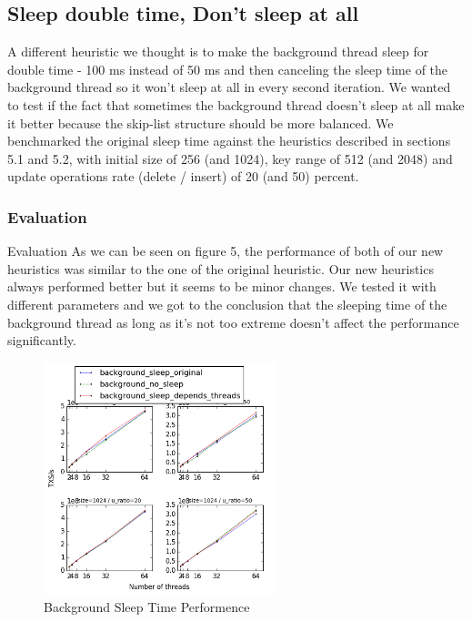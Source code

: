 \documentclass{article}
\begin{document}
\subsection{Sleep double time, Don't sleep at all}
\label{ssec:sdt}

A different heuristic we thought is to make the background thread sleep for double time - 100 ms instead of 50 ms and then canceling the sleep time of the background thread so it won't sleep at all in every second iteration.
We wanted to test if the fact that sometimes the background thread doesn't sleep at all make it better because the skip-list structure should be more balanced.
We benchmarked the original sleep time against the heuristics described in sections 5.1 and 5.2, with initial size of 256 (and 1024), key range of 512 (and 2048) and update operations rate (delete / insert) of 20 (and 50) percent. 

\subsubsection{Evaluation}
\label{sssec:dsrs-evl1}

Evaluation As we can be seen on figure 5, the performance of both of our new heuristics was similar to the one of the original heuristic. Our new heuristics always performed better but it seems to be minor changes. We tested it with different parameters and we got to the conclusion that the sleeping time of the background thread as long as it's not too extreme doesn't affect the performance significantly.

\begin{figure}
	\caption{Background Sleep Time Performence}
	\centering
	\includegraphics[width=0.6\textwidth]{sleep_plot}
\end{figure}
\end{document}
